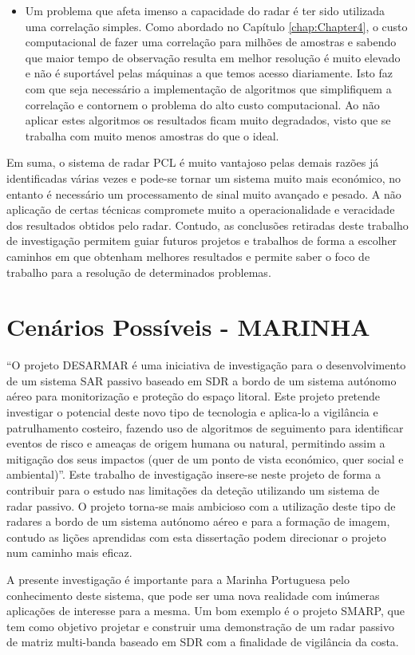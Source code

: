 \begin{itemize}
\item Um problema que afeta imenso a capacidade do radar é ter sido utilizada uma correlação simples. Como abordado no Capítulo \ref{chap:Chapter4}, o custo computacional de fazer uma correlação para milhões de amostras e sabendo que maior tempo de observação resulta em melhor resolução é muito elevado e não é suportável pelas máquinas a que temos acesso diariamente. Isto faz com que seja necessário a implementação de algoritmos que simplifiquem a correlação e contornem o problema do alto custo computacional. Ao não aplicar estes algoritmos os resultados ficam muito degradados, visto que se trabalha com muito menos amostras do que o ideal.


\end{itemize}


Em suma, o sistema de radar \gls{PCL} é muito vantajoso pelas demais razões já identificadas várias vezes e pode-se tornar um sistema muito mais económico, no entanto é necessário um processamento de sinal muito avançado e pesado. A não aplicação de certas técnicas compromete muito a operacionalidade e veracidade dos resultados obtidos pelo radar. Contudo, as conclusões retiradas deste trabalho de investigação permitem guiar futuros projetos e trabalhos de forma a escolher caminhos em que obtenham melhores resultados e permite saber o foco de trabalho para a resolução de determinados problemas.


\section{Cenários Possíveis - MARINHA}
“O projeto DESARMAR é uma iniciativa de investigação para o desenvolvimento de um sistema \gls{SAR} passivo baseado em \gls{SDR} a bordo de um sistema autónomo aéreo para monitorização e proteção do espaço litoral. Este projeto pretende investigar o potencial deste novo tipo de tecnologia e aplica-lo a vigilância e patrulhamento costeiro, fazendo uso de algoritmos de seguimento para identificar eventos de risco e ameaças de origem humana ou natural, permitindo assim a mitigação dos seus impactos (quer de um ponto de vista económico, quer social e ambiental)”. Este trabalho de investigação insere-se neste projeto de forma a contribuir para o estudo nas limitações da deteção utilizando um sistema de radar passivo. O projeto torna-se mais ambicioso com a utilização deste tipo de radares a bordo de um sistema autónomo aéreo e para a formação de imagem, contudo as lições aprendidas com esta dissertação podem direcionar o projeto num caminho mais eficaz.\par
A presente investigação é importante para a Marinha Portuguesa pelo conhecimento deste sistema, que pode ser uma nova realidade com inúmeras aplicações de interesse para a mesma. Um bom exemplo é o projeto \gls{SMARP}, que tem como objetivo projetar e construir uma demonstração de um radar passivo de matriz multi-banda baseado em \gls{SDR} com a finalidade de vigilância da costa.


